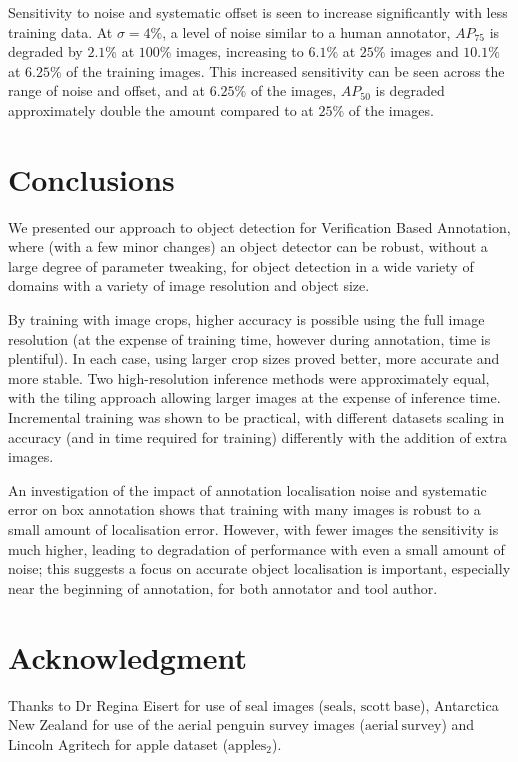 \documentclass[conference]{IEEEtran}
\begin{document}
Sensitivity to noise and systematic offset is seen to increase significantly with less training data. At $\sigma=4\%$, a level of noise similar to a human annotator, $AP_{75}$ is degraded by $2.1\%$ at $100\%$ images, increasing to $6.1\%$ at $25\%$ images and $10.1\%$ at $6.25\%$ of the training images. This increased sensitivity can be seen across the range of noise and offset, and at $6.25\%$ of the images, $AP_{50}$ is degraded approximately double the amount compared to at $25\%$ of the images.


\section {Conclusions}

We presented our approach to object detection for Verification Based Annotation, where (with a few minor changes) an object detector \cite{Lin2017} can be robust, without a large degree of parameter tweaking, for object detection in a wide variety of domains with a variety of image resolution and object size.

By training with image crops, higher accuracy is possible using the full image resolution (at the expense of training time, however during annotation, time is plentiful). In each case, using larger crop sizes proved better, more accurate and more stable. Two high-resolution inference methods were approximately equal, with the tiling approach allowing larger images at the expense of inference time. Incremental training was shown to be practical, with different datasets scaling in accuracy (and in time required for training) differently with the addition of extra images. 

An investigation of the impact of annotation localisation noise and systematic error on box annotation shows that training with many images is robust to a small amount of localisation error. However, with fewer images the sensitivity is much higher, leading to degradation of performance with even a small amount of noise; this suggests a focus on accurate object localisation is important, especially near the beginning of annotation, for both annotator and tool author.

\section*{Acknowledgment}

Thanks to Dr Regina Eisert for use of seal images ($\mathrm{seals}$, $\mathrm{scott\:base}$), Antarctica New Zealand for use of the aerial penguin survey images ($\mathrm{aerial\:survey}$) and Lincoln Agritech for apple dataset ($\mathrm{apples_2}$).



\end{document}
